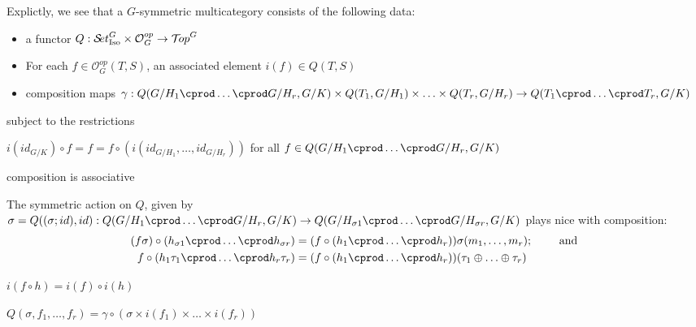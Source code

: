 \documentclass{report}
\newenvironment{renumerate}
{\begin{list}{\roman{enumi}.}
    {\itemsep=0in\usecounter{enumi}}
  }{\end{list}}
\newcommand{\Top}{\text{$\mathcal{T}\!op$}}
\newcommand{\Set}{\text{$\mathcal{S}\!et$}}
\newcommand{\SetGI}{\text{$\Set^G_{\mbox{\scriptsize Iso}}$}}
\renewcommand{\O}{\text{$\mathcal{O}$}}
\begin{document}
Explictly, we see that a $G$-symmetric multicategory consists of the following data:
\begin{itemize}\itemsep-4pt
\item a functor $Q: \SetGI \times \O_G^{op} \to \Top^G$
\item For each $f\in\O_G^{op}(T,S)$, an associated element $i(f)\in Q(T,S)$
\item composition maps $\gamma:Q(G/H_1\cprod\ldots\cprod G/H_r, G/K)\times Q(T_1, G/H_1)\times\ldots\times Q(T_r,G/H_r) \to Q(T_1\cprod\ldots\cprod T_r, G/K)$ 
\end{itemize}
subject to the restrictions
\begin{renumerate}
\item $i(id_{G/K})\circ f = f = f\circ (i(id_{G/H_1}, \ldots, id_{G/H_r}))$ for all $f\in Q(G/H_1\cprod\ldots\cprod G/H_r, G/K)$
\item composition is associative
\item The symmetric action on $Q$, given by $\sigma = Q((\sigma;id),id): Q(G/H_1\cprod\ldots\cprod G/H_r,G/K) \to Q(G/H_{\sigma 1}\cprod\ldots\cprod G/H_{\sigma r},G/K)$ plays nice with composition:
  \begin{align*}
    (f\sigma)\circ (h_{\sigma 1}\cprod\ldots\cprod h_{\sigma r}) &= (f\circ (h_1\cprod\ldots\cprod h_r))\sigma(m_1,\ldots,m_r); \qquad \mbox{ and }\\
      f\circ (h_1\tau_1\cprod\ldots\cprod h_r\tau_r) &= (f\circ(h_1\cprod\ldots\cprod h_r))(\tau_1\oplus\ldots\oplus\tau_r)
  \end{align*}
\item $i(f\circ h) = i(f)\circ i(h)$
\item $Q(\sigma,f_1,\ldots, f_r) = \gamma\circ(\sigma\times i(f_1)\times\ldots\times i(f_r))$
\end{renumerate}








\end{document}
